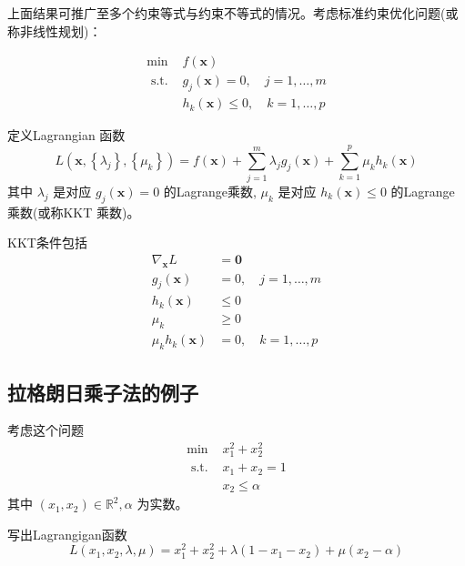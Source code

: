 上面结果可推广至多个约束等式与约束不等式的情况。考虑标准约束优化问题(或称非线性规划)：

\begin{definition}
    $$
\begin{array}{ll}
\min & f(\mathbf{x}) \\
\text { s.t. } & g_{j}(\mathbf{x})=0, \quad j=1, \ldots, m \\
& h_{k}(\mathbf{x}) \leq 0, \quad k=1, \ldots, p
\end{array}
$$
\end{definition}

\begin{theorem}[标准约束优化的KKT条件]
    定义Lagrangian 函数
$$
L\left(\mathbf{x},\left\{\lambda_{j}\right\},\left\{\mu_{k}\right\}\right)=f(\mathbf{x})+\sum_{j=1}^{m} \lambda_{j} g_{j}(\mathbf{x})+\sum_{k=1}^{p} \mu_{k} h_{k}(\mathbf{x})
$$
其中 $ \lambda_{j} $ 是对应 $ g_{j}(\mathbf{x})=0 $ 的Lagrange乘数, $ \mu_{k} $ 是对应 $ h_{k}(\mathbf{x}) \leq 0 $ 的Lagrange乘数(或称KKT 乘数)。 

KKT条件包括
$$
\begin{aligned}
\nabla_{\mathbf{x}} L &=\mathbf{0} \\
g_{j}(\mathbf{x}) &=0, \quad j=1, \ldots, m \\
h_{k}(\mathbf{x}) & \leq 0 \\
\mu_{k} & \geq 0 \\
\mu_{k} h_{k}(\mathbf{x}) &=0, \quad k=1, \ldots, p
\end{aligned}
$$

\end{theorem}

\subsection{拉格朗日乘子法的例子}

\begin{problem}

    考虑这个问题
$$
\begin{array}{ll}
\min & x_{1}^{2}+x_{2}^{2} \\
\text { s.t. } & x_{1}+x_{2}=1 \\
& x_{2} \leq \alpha
\end{array}
$$
其中 $ \left(x_{1}, x_{2}\right) \in \mathbb{R}^{2}, \alpha $ 为实数。
\end{problem}

写出Lagrangigan函数
$$
L\left(x_{1}, x_{2}, \lambda, \mu\right)=x_{1}^{2}+x_{2}^{2}+\lambda\left(1-x_{1}-x_{2}\right)+\mu\left(x_{2}-\alpha\right)
$$

